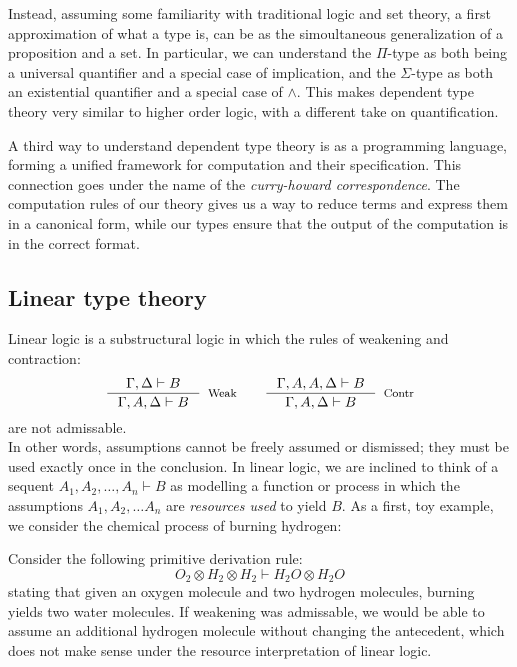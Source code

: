 Instead, assuming some familiarity with traditional logic and set theory, a first approximation of what a type is, can be as the simoultaneous generalization of a proposition and a set. In particular, we can understand the $\Pi$-type as both being a universal quantifier and a special case of implication, and the $\Sigma$-type as both an existential quantifier and a special case of $\land$. This makes dependent type theory very similar to higher order logic, with a different take on quantification.

A third way to understand dependent type theory is as a programming language, forming a unified framework for computation and their specification. This connection goes under the name of the \textit{curry-howard correspondence}. The computation rules of our theory gives us a way to reduce terms and express them in a canonical form, while our types ensure that the output of the computation is in the correct format.
\subsection{Linear type theory}
Linear logic is a substructural logic in which the rules of weakening and contraction:
\[
  \begin{split}
    \inference{\Gamma, \Delta \vdash B}{\Gamma, A, \Delta \vdash B}[Weak] \quad \quad 
    \inference{\Gamma, A, A, \Delta \vdash B}{\Gamma, A, \Delta \vdash B}[Contr]
    \end{split}
\]
are not admissable.\\
In other words, assumptions cannot be freely assumed or dismissed; they must be used exactly once in the conclusion. In linear logic, we are inclined to think of a sequent $A_1, A_2, \dots, A_n \vdash B$ as modelling a function or process in which the assumptions $A_1, A_2, \dots A_n$ are \textit{resources used} to yield $B$. As a first, toy example, we consider the chemical process of burning hydrogen:
\begin{expl}\label{burn}
Consider the following primitive derivation rule: 
\[
  O_2 \otimes H_2 \otimes H_2 \vdash H_2O \otimes H_2O
\]
stating that given an oxygen molecule and two hydrogen molecules, burning yields two water molecules. If weakening was admissable, we would be able to assume an additional hydrogen molecule without changing the antecedent, which does not make sense under the resource interpretation of linear logic.\\
\end{expl}

